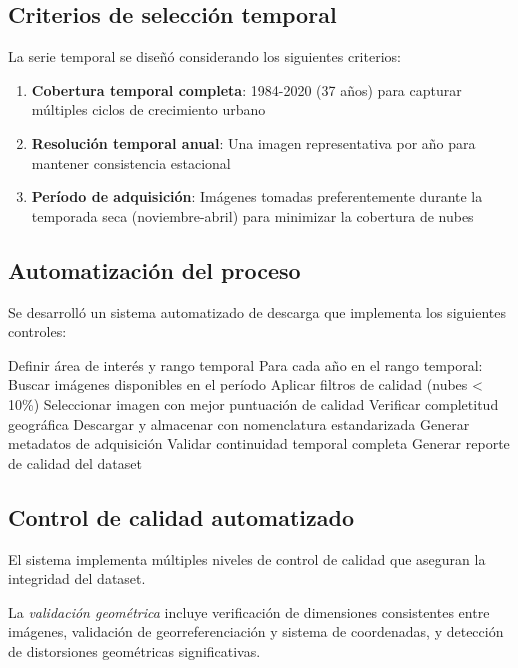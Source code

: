 \subsection{Criterios de selección temporal}

La serie temporal se diseñó considerando los siguientes criterios:

\begin{enumerate}
	\item \textbf{Cobertura temporal completa}: 1984-2020 (37 años) para capturar múltiples ciclos de crecimiento urbano
	\item \textbf{Resolución temporal anual}: Una imagen representativa por año para mantener consistencia estacional
	\item \textbf{Período de adquisición}: Imágenes tomadas preferentemente durante la temporada seca (noviembre-abril) para minimizar la cobertura de nubes
\end{enumerate}
\subsection{Automatización del proceso}

Se desarrolló un sistema automatizado de descarga que implementa los siguientes controles:

\begin{algorithm}
\caption{Protocolo de adquisición automatizada}
\begin{algorithmic}[1]
\STATE Definir área de interés y rango temporal
\STATE Para cada año en el rango temporal:
	\STATE \quad Buscar imágenes disponibles en el período
	\STATE \quad Aplicar filtros de calidad (nubes < 10\%)
	\STATE \quad Seleccionar imagen con mejor puntuación de calidad
	\STATE \quad Verificar completitud geográfica
	\STATE \quad Descargar y almacenar con nomenclatura estandarizada
	\STATE \quad Generar metadatos de adquisición
\STATE Validar continuidad temporal completa
\STATE Generar reporte de calidad del dataset
\end{algorithmic}
\end{algorithm}

\subsection{Control de calidad automatizado}

El sistema implementa múltiples niveles de control de calidad que aseguran la integridad del dataset.

La \textit{validación geométrica} incluye verificación de dimensiones consistentes entre imágenes, validación de georreferenciación y sistema de coordenadas, y detección de distorsiones geométricas significativas.

